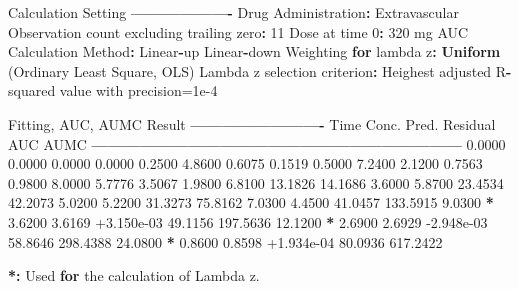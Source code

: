 \documentclass[12pt,]{krantz}
\newenvironment{Shaded}{\begin{snugshade}}{\end{snugshade}}
\newcommand{\ControlFlowTok}[1]{\textcolor[rgb]{0.13,0.29,0.53}{\textbf{#1}}}
\newcommand{\DecValTok}[1]{\textcolor[rgb]{0.00,0.00,0.81}{#1}}
\newcommand{\ErrorTok}[1]{\textcolor[rgb]{0.64,0.00,0.00}{\textbf{#1}}}
\newcommand{\FloatTok}[1]{\textcolor[rgb]{0.00,0.00,0.81}{#1}}
\newcommand{\KeywordTok}[1]{\textcolor[rgb]{0.13,0.29,0.53}{\textbf{#1}}}
\newcommand{\NormalTok}[1]{#1}
\newcommand{\OperatorTok}[1]{\textcolor[rgb]{0.81,0.36,0.00}{\textbf{#1}}}
\newcommand{\StringTok}[1]{\textcolor[rgb]{0.31,0.60,0.02}{#1}}
\begin{document}
\begin{Shaded}
\begin{Highlighting}[]
{{{{{{{{{{{{\NormalTok{Calculation Setting}
\OperatorTok{-------------------}
\NormalTok{Drug Administration}\OperatorTok{:}\StringTok{ }\NormalTok{Extravascular}
\NormalTok{Observation count excluding trailing zero}\OperatorTok{:}\StringTok{ }\DecValTok{11}
\NormalTok{Dose at time }\DecValTok{0}\OperatorTok{:}\StringTok{ }\DecValTok{320}\NormalTok{ mg}
\NormalTok{AUC Calculation Method}\OperatorTok{:}\StringTok{ }\NormalTok{Linear}\OperatorTok{-}\NormalTok{up Linear}\OperatorTok{-}\NormalTok{down}
\NormalTok{Weighting }\ControlFlowTok{for}\NormalTok{ lambda z}\OperatorTok{:}\StringTok{ }\KeywordTok{Uniform}\NormalTok{ (Ordinary Least Square, OLS)}
\NormalTok{Lambda z selection criterion}\OperatorTok{:}\StringTok{ }\NormalTok{Heighest adjusted R}\OperatorTok{-}\NormalTok{squared value with precision=}\FloatTok{1e-4}


\NormalTok{Fitting, AUC, AUMC Result}
\OperatorTok{-------------------------}
\StringTok{      }\NormalTok{Time         Conc.      Pred.   Residual       AUC       AUMC}
\OperatorTok{---------------------------------------------------------------------}
\StringTok{     }\FloatTok{0.0000}       \FloatTok{0.0000}                           \FloatTok{0.0000}     \FloatTok{0.0000}
     \FloatTok{0.2500}       \FloatTok{4.8600}                           \FloatTok{0.6075}     \FloatTok{0.1519}
     \FloatTok{0.5000}       \FloatTok{7.2400}                           \FloatTok{2.1200}     \FloatTok{0.7563}
     \FloatTok{0.9800}       \FloatTok{8.0000}                           \FloatTok{5.7776}     \FloatTok{3.5067}
     \FloatTok{1.9800}       \FloatTok{6.8100}                          \FloatTok{13.1826}    \FloatTok{14.1686}
     \FloatTok{3.6000}       \FloatTok{5.8700}                          \FloatTok{23.4534}    \FloatTok{42.2073}
     \FloatTok{5.0200}       \FloatTok{5.2200}                          \FloatTok{31.3273}    \FloatTok{75.8162}
     \FloatTok{7.0300}       \FloatTok{4.4500}                          \FloatTok{41.0457}   \FloatTok{133.5915}
     \FloatTok{9.0300} \OperatorTok{*}\StringTok{     }\FloatTok{3.6200}     \FloatTok{3.6169} \FloatTok{+3.150e-03}    \FloatTok{49.1156}   \FloatTok{197.5636}
    \FloatTok{12.1200} \OperatorTok{*}\StringTok{     }\FloatTok{2.6900}     \FloatTok{2.6929} \FloatTok{-2.948e-03}    \FloatTok{58.8646}   \FloatTok{298.4388}
    \FloatTok{24.0800} \OperatorTok{*}\StringTok{     }\FloatTok{0.8600}     \FloatTok{0.8598} \FloatTok{+1.934e-04}    \FloatTok{80.0936}   \FloatTok{617.2422}

\OperatorTok{*}\ErrorTok{:}\StringTok{ }\NormalTok{Used }\ControlFlowTok{for}\NormalTok{ the calculation of Lambda z.}


}}}}}}}}}}}}
\end{Highlighting}
\end{Shaded}
\end{document}
